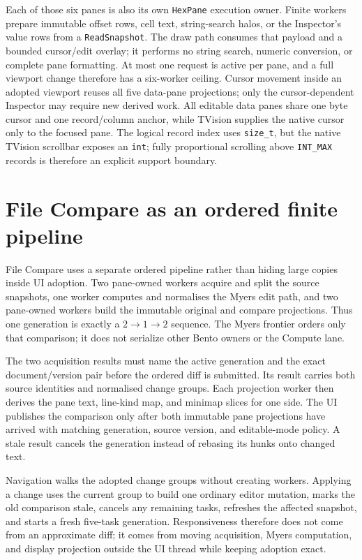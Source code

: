 \documentclass[a4paper,10pt,twoside,openany]{book}
\begin{document}
Each of those six panes is also its own \texttt{HexPane} execution owner.
Finite workers prepare immutable offset rows, cell text, string-search halos,
or the Inspector's value rows from a \texttt{ReadSnapshot}. The draw path
consumes that payload and a bounded cursor/edit overlay; it performs no string
search, numeric conversion, or complete pane formatting. At most one request
is active per pane, and a full viewport change therefore has a six-worker
ceiling. Cursor movement inside an adopted viewport reuses all five data-pane
projections; only the cursor-dependent Inspector may require new derived work.
All editable data panes share one byte cursor and one record/column anchor,
while TVision supplies the native cursor only to the focused pane. The logical
record index uses \texttt{size\_t}, but the native TVision scrollbar exposes an
\texttt{int}; fully proportional scrolling above \texttt{INT\_MAX} records is
therefore an explicit support boundary.

\section{File Compare as an ordered finite pipeline}

File Compare uses a separate ordered pipeline rather than hiding large copies
inside UI adoption. Two pane-owned workers acquire and split the source
snapshots, one worker computes and normalises the Myers edit path, and two
pane-owned workers build the immutable original and compare projections. Thus
one generation is exactly a \(2\rightarrow1\rightarrow2\) sequence. The
Myers frontier orders only that comparison; it does not serialize other Bento
owners or the Compute lane.

The two acquisition results must name the active generation and the exact
document/version pair before the ordered diff is submitted. Its result carries
both source identities and normalised change groups. Each projection worker
then derives the pane text, line-kind map, and minimap slices for one side.
The UI publishes the comparison only after both immutable
pane projections have arrived with matching generation, source version, and
editable-mode policy. A stale result cancels the generation instead of
rebasing its hunks onto changed text.

Navigation walks the adopted change groups without creating workers. Applying
a change uses the current group to build one ordinary editor mutation, marks
the old comparison stale, cancels any remaining tasks, refreshes the affected
snapshot, and starts a fresh five-task generation. Responsiveness therefore
does not come from an approximate diff; it comes from moving acquisition,
Myers computation, and display projection outside the UI thread while keeping
adoption exact.
\end{document}

